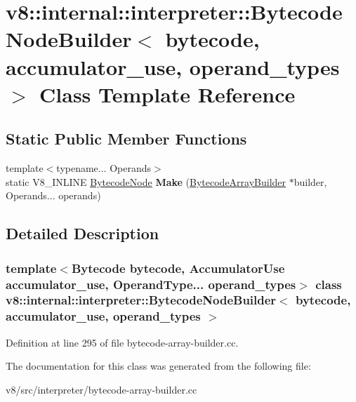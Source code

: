\hypertarget{classv8_1_1internal_1_1interpreter_1_1BytecodeNodeBuilder}{}\section{v8\+:\+:internal\+:\+:interpreter\+:\+:Bytecode\+Node\+Builder$<$ bytecode, accumulator\+\_\+use, operand\+\_\+types $>$ Class Template Reference}
\label{classv8_1_1internal_1_1interpreter_1_1BytecodeNodeBuilder}
\subsection*{Static Public Member Functions}
\begin{DoxyCompactItemize}
\item 
\mbox{\label{classv8_1_1internal_1_1interpreter_1_1BytecodeNodeBuilder_abdad617c1351b76bb35a150624622183}} 
{\footnotesize template$<$typename... Operands$>$ }\\static V8\+\_\+\+I\+N\+L\+I\+NE \mbox{\hyperlink{classv8_1_1internal_1_1interpreter_1_1BytecodeNode}{Bytecode\+Node}} {\bfseries Make} (\mbox{\hyperlink{classv8_1_1internal_1_1interpreter_1_1BytecodeArrayBuilder}{Bytecode\+Array\+Builder}} $\ast$builder, Operands... operands)
\end{DoxyCompactItemize}


\subsection{Detailed Description}
\subsubsection*{template$<$Bytecode bytecode, Accumulator\+Use accumulator\+\_\+use, Operand\+Type... operand\+\_\+types$>$\newline
class v8\+::internal\+::interpreter\+::\+Bytecode\+Node\+Builder$<$ bytecode, accumulator\+\_\+use, operand\+\_\+types $>$}



Definition at line 295 of file bytecode-\/array-\/builder.\+cc.



The documentation for this class was generated from the following file\+:\begin{DoxyCompactItemize}
\item 
v8/src/interpreter/bytecode-\/array-\/builder.\+cc\end{DoxyCompactItemize}
